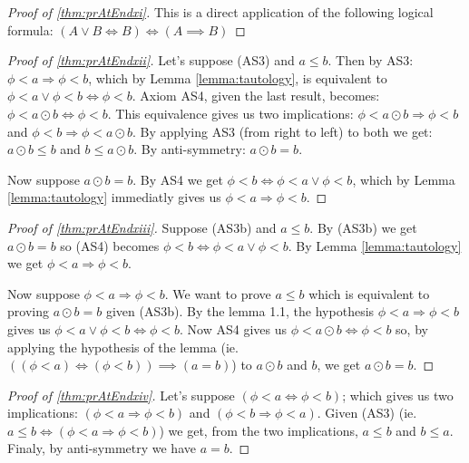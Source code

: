 \label{proofsection:prAtEndxi}\begin{proof}[Proof of \autoref{thm:prAtEndxi}]\label{proof:prAtEndxi}This is a direct application of the following logical formula: $ (A \lor B \iff B) \iff (A \implies B) $\end{proof}
\label{proofsection:prAtEndxii}\begin{proof}[Proof of \autoref{thm:prAtEndxii}]\label{proof:prAtEndxii}Let's suppose (AS3) and $a \leq b$. Then by AS3: $\phi < a \Rightarrow \phi < b$, which by Lemma \ref {lemma:tautology}, is equivalent to $\phi < a \lor \phi < b \iff \phi < b$. Axiom AS4, given the last result, becomes: $\phi < a \odot b \iff \phi < b$. This equivalence gives us two implications: $\phi < a \odot b \Rightarrow \phi < b$ and $\phi < b \Rightarrow \phi < a \odot b$. By applying AS3 (from right to left) to both we get: $a \odot b \leq b$ and $b \leq a \odot b$. By anti-symmetry: $a \odot b = b$. \par Now suppose $a \odot b = b$. By AS4 we get $\phi < b \iff \phi < a \lor \phi < b$, which by Lemma \ref {lemma:tautology} immediatly gives us $\phi < a \Rightarrow \phi < b$.\end{proof}
\label{proofsection:prAtEndxiii}\begin{proof}[Proof of \autoref{thm:prAtEndxiii}]\label{proof:prAtEndxiii}Suppose (AS3b) and $a \leq b$. By (AS3b) we get $a \odot b = b$ so (AS4) becomes $\phi < b \iff \phi < a \lor \phi < b$. By Lemma \ref {lemma:tautology} we get $\phi < a \Rightarrow \phi < b$. \par Now suppose $\phi < a \Rightarrow \phi < b$. We want to prove $a \leq b$ which is equivalent to proving $a \odot b = b$ given (AS3b). By the lemma 1.1, the hypothesis $\phi < a \Rightarrow \phi < b$ gives us $\phi < a \lor \phi < b \iff \phi < b$. Now AS4 gives us $\phi < a \odot b \iff \phi < b$ so, by applying the hypothesis of the lemma (ie. $((\phi < a) \iff (\phi < b)) \implies (a = b)$) to $a \odot b$ and $b$, we get $a \odot b = b$.\end{proof}
\label{proofsection:prAtEndxiv}\begin{proof}[Proof of \autoref{thm:prAtEndxiv}]\label{proof:prAtEndxiv}Let's suppose $(\phi < a \iff \phi < b)$; which gives us two implications: $(\phi < a \Rightarrow \phi < b)$ and $(\phi < b \Rightarrow \phi < a)$. Given (AS3) (ie. $a \leq b \iff (\phi < a \Rightarrow \phi < b)$) we get, from the two implications, $a \leq b$ and $b \leq a$. Finaly, by anti-symmetry we have $a=b$.\end{proof}
